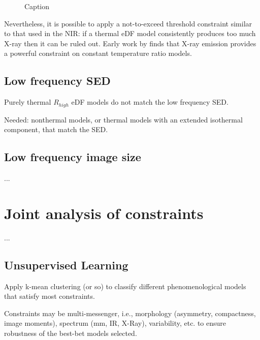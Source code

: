 \documentclass[twocolumn,tighten,dvipsnames]{aastex63}
\newcommand\<{{\langle}}
\renewcommand\>{{\rangle}} %
\begin{document}
\begin{figure}
    \centering
    \caption{Caption}
    \label{fig:SEDexamp}
\end{figure}

Nevertheless, it is possible to apply a not-to-exceed threshold constraint similar to that used in the NIR: if a thermal eDF model consistently produces too much X-ray then it can be ruled out.  Early work by \citet{2009ApJ...706..497M} finds that X-ray emission provides a powerful constraint on constant temperature ratio models.

\subsection{Low frequency SED}
\label{sec:lfconst}

Purely thermal $R_{high}$ eDF models do not match the low frequency SED.

Needed: nonthermal models, or thermal models with an extended isothermal component, that match the SED.

\subsection{Low frequency image size}
\label{sec:lfsizeconst}

...

\section{Joint analysis of constraints}
\label{sec:allconst}

...

\subsection{Unsupervised Learning}
\label{sec:ml}

Apply k-mean clustering (or so) to classify different phenomenological models that satisfy most constraints.

Constraints may be multi-messenger, i.e., morphology (asymmetry, compactness, image moments), spectrum (mm, IR, X-Ray), variability, etc. to ensure robustness of the best-bet models selected.
\end{document}
